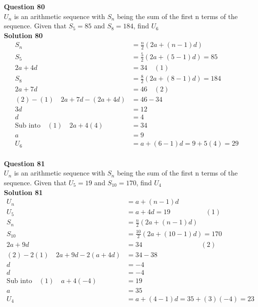 \documentclass{article}
\begin{document}
\noindent\textbf{Question 80}\\[5pt]
$U_n$ is an arithmetic sequence with $S_n$ being the sum of the first n terms of the sequence. Given that $S_{5}=85$ and $S_8=184$, find $U_{6}$\\[5pt]
\noindent\textbf{Solution 80}\\[5pt]
\begin{align*}
S_n&=\displaystyle\frac{n}{2}(2a+(n-1)d)\\[2pt]
S_5&=\displaystyle\frac{5}{2}(2a+(5-1)d)=85\\[2pt]
2a+4d&=34\quad (1)\\[2pt]
S_8&=\displaystyle\frac{8}{2}(2a+(8-1)d)=184\\[2pt]
2a+7d&=46 \quad (2)\\[2pt]
(2)-(1) \quad 2a+7d-(2a+4d)&=46-34\\[2pt]
3d&=12\\[2pt]
d&=4\\[2pt]
\text{Sub into}\quad (1) \quad 2a+4(4)&=34\\[2pt]
a&=9\\[12pt]
U_6&=a+(6-1)d=9+5(4)=29
\end{align*}\\[10pt]

\noindent\textbf{Question 81}\\[5pt]
$U_n$ is an arithmetic sequence with $S_n$ being the sum of the first n terms of the sequence. Given that $U_{5}=19$ and $S_{10}=170$, find $U_{4}$\\[5pt]
\noindent\textbf{Solution 81}\\[5pt]
\begin{align*}
U_n&=a+(n-1)d\\[2pt]
U_5&=a+4d=19 \hspace{62pt} (1)\\[2pt]
S_n&=\displaystyle\frac{n}{2}(2a+(n-1)d)\\[2pt]
S_{10}&=\displaystyle\frac{10}{2}(2a+(10-1)d)=170\\[2pt]
2a+9d&=34\hspace{103pt} (2)\\[2pt]
(2)-2(1) \quad 2a+9d-2(a+4d)&=34-38\\[2pt]
d&=-4\\[2pt]
d&=-4\\[2pt]
\text{Sub into}\quad (1) \quad a+4(-4)&=19\\[2pt]
a&=35\\[12pt]
U_4&=a+(4-1)d=35+(3)(-4)=23
\end{align*}\\[10pt]
\end{document}
